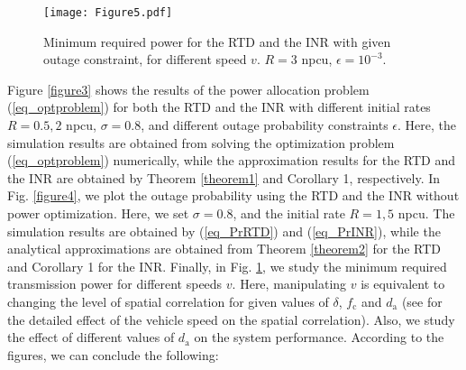 \begin{figure}
\centering
  \texttt{[image: Figure5.pdf]}\\
\caption{Minimum required power for the RTD and the INR with given outage constraint, for different speed $v$. $R = 3$ npcu, $\epsilon = 10^{-3}$.}\label{figure5}
\end{figure}

Figure \ref{figure3} shows the results of the power allocation problem (\ref{eq_optproblem}) for both the RTD and the INR with different initial rates $R = 0.5, 2$ npcu, $\sigma = 0.8$, and different outage probability constraints $\epsilon$. Here, the simulation results are obtained from  solving the optimization problem (\ref{eq_optproblem}) numerically, while the approximation results for the RTD and the INR are obtained by Theorem \ref{theorem1} and Corollary 1, respectively.  In Fig. \ref{figure4}, we plot the outage probability using the  RTD and the INR  without power optimization. Here, we set $\sigma = 0.8$, and the initial rate $R = 1, 5$ npcu. The simulation results are obtained by (\ref{eq_PrRTD}) and (\ref{eq_PrINR}), while the analytical approximations are obtained from Theorem \ref{theorem2} for the RTD and Corollary 1 for the INR. Finally, in Fig. \ref{figure5},  we study the minimum required transmission power for different speeds $v$. Here, manipulating $v$ is  equivalent to changing the level of spatial correlation for given values of $\delta$, $f_\text{c}$ and $d_\text{a}$ (see \cite{guo2020semilinear} for the detailed effect of the vehicle speed on the spatial correlation). Also, we study the effect of different values of $d_\text{a}$ on the system performance.   According to the figures, we can conclude the following:


























